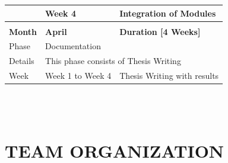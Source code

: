 \documentclass[oneside,a4paper,12pt]{report}
\begin{document}
\begin{table}[h!]
\begin{center}
\begin{tabular}{|l|l|l|}
                      & Week 4                             & Integration of Modules                                                                                                   \\ \hline
\multicolumn{3}{|l|}{}                                                                                                                                                                \\ \hline
\textbf{Month}        & \textbf{April}                       & \textbf{Duration {[}4 Weeks{]}}                                                                                          \\ \hline
Phase                 & \multicolumn{2}{|l|}{Documentation}                                                                                                                           \\ \hline
Details               & \multicolumn{2}{|l|}{This phase consists of Thesis Writing}                                                                                                   \\ \hline
Week                  & Week 1 to Week 4                   & Thesis Writing with results                                                                                               \\ \hline                     
\end{tabular}
\end{center}
\end{table}
\\\
\newpage
\section{TEAM ORGANIZATION}
\end{document}
